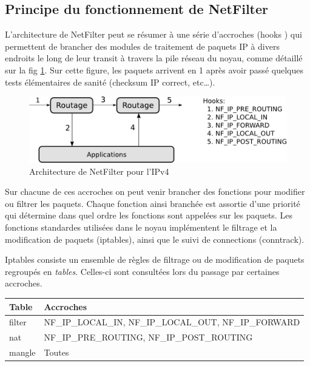 \subsection{Principe du fonctionnement de NetFilter}

L'architecture de NetFilter peut se résumer à une série d'accroches
(\og hooks \fg{}) qui permettent de brancher des modules de traitement de
paquets IP à divers endroits le long de leur transit à travers la pile
réseau du noyau, comme détaillé sur la fig \ref{NF}. Sur cette figure,
les paquets arrivent en 1 après avoir passé quelques tests
élémentaires de sanité (checksum IP correct, etc\ldots).

\begin{figure}[h]
  \begin{center}
    \includegraphics{netfilter.png}
    \caption{Architecture de NetFilter pour l'IPv4}
    \label{NF}
  \end{center}
\end{figure}

Sur chacune de ces accroches on peut venir brancher des fonctions pour
modifier ou filtrer les paquets. Chaque fonction ainsi branchée est
assortie d'une priorité qui détermine dans quel ordre les fonctions
sont appelées sur les paquets. Les fonctions standardes utilisées dans
le noyau implémentent le filtrage et la modification de paquets
(iptables), ainsi que le suivi de connections (conntrack).

Iptables consiste un ensemble de règles de filtrage ou de modification
de paquets regroupés en \textit{tables}. Celles-ci sont consultées
lors du passage par certaines accroches.

\begin{center}
  \begin{tabular}{|l|l|}
    \hline
    \textbf{Table} & \textbf{Accroches} \\
    \hline
    filter & NF\_IP\_LOCAL\_IN, NF\_IP\_LOCAL\_OUT, NF\_IP\_FORWARD \\
    \hline
    nat & NF\_IP\_PRE\_ROUTING, NF\_IP\_POST\_ROUTING \\
    \hline
    mangle & Toutes \\
    \hline
  \end{tabular}
\end{center}

